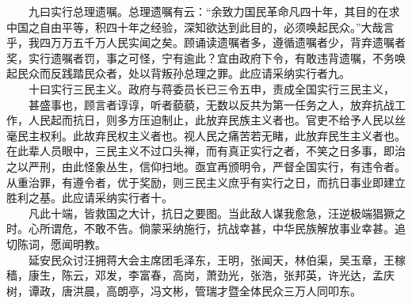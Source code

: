 \documentclass[cn,11pt,chinese]{elegantbook}
\begin{document}
　　九曰实行总理遗嘱。总理遗嘱有云：“余致力国民革命凡四十年，其目的在求中国之自由平等，积四十年之经验，深知欲达到此目的，必须唤起民众。”大哉言乎，我四万万五千万人民实闻之矣。顾诵读遗嘱者多，遵循遗嘱者少，背弃遗嘱者奖，实行遗嘱者罚，事之可怪，宁有逾此？宜由政府下令，有敢违背遗嘱，不务唤起民众而反践踏民众者，处以背叛孙总理之罪。此应请采纳实行者九。\\
　　十曰实行三民主义。政府与蒋委员长已三令五申，责成全国实行三民主义，
　　甚盛事也，顾言者谆谆，听者藐藐，无数以反共为第一任务之人，放弃抗战工作，人民起而抗日，则多方压迫制止，此放弃民族主义者也。官吏不给予人民以丝毫民主权利。此故弃民权主义者也。视人民之痛苦若无睹，此放弃民生主义者也。在此辈人员眼中，三民主义不过口头禅，而有真正实行之者，不笑之日多事，即治之以严刑，由此怪象丛生，信仰扫地。亟宜再颁明令，严督全国实行，有违令者。从重治罪，有遵令者，优于奖励，则三民主义庶乎有实行之日，而抗日事业即建立胜利之基。此应请采纳实行者十。\\
　　凡此十端，皆救国之大计，抗日之要图。当此敌人谋我愈急，汪逆极端猖獗之时。心所谓危，不敢不告。倘蒙采纳施行，抗战幸甚，中华民族解放事业幸甚。追切陈词，愿闻明教。\\
　　延安民众讨汪拥蒋大会主席团毛泽东，王明，张闻天，林伯渠，吴玉章，王稼穑，康生，陈云，邓发，李富春，高岗，萧劲光，张浩，张邦英，许光达，孟庆树，谭政，唐洪晨，高朗亭，冯文彬，管瑞才暨全体民众三万人同叩东。\\
\newpage
\end{document}

